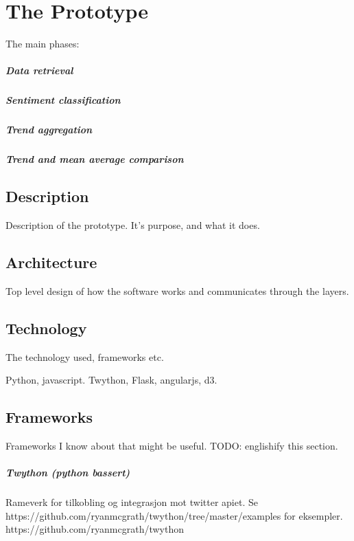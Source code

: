 \chapter{The Prototype}

The main phases: 
\paragraph{Data retrieval}
\paragraph{Sentiment classification}
\paragraph{Trend aggregation}
\paragraph{Trend and mean average comparison}

\section{Description}
Description of the prototype. It's purpose, and what it does. 

\section{Architecture}
Top level design of how the software works and communicates through the layers.
\section{Technology}
The technology used, frameworks etc.

Python, javascript.
Twython, Flask, angularjs, d3.

\section{Frameworks}
Frameworks I know about that might be useful.
TODO: englishify this section. 

\paragraph{Twython (python bassert)}
Rameverk for tilkobling og integrasjon mot twitter apiet.
Se https://github.com/ryanmcgrath/twython/tree/master/examples for eksempler.
https://github.com/ryanmcgrath/twython

